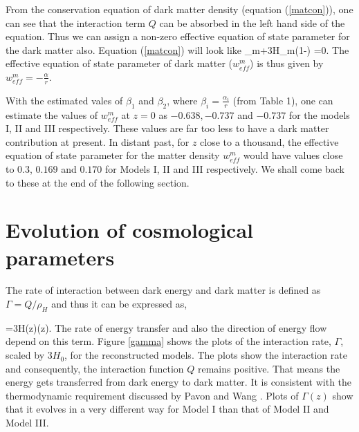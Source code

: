 \documentclass[11pt]{article}
\begin{document}
From the conservation equation of dark matter density (equation (\ref{matcon})), one can see that the interaction term $Q$ can be absorbed in the left hand side of the equation. Thus we can assign a non-zero effective equation of state parameter for the dark matter also. Equation (\ref{matcon}) will look like 
\be
\dot{\rho}_m+3H\rho_m(1-) =0.
\label{wmeff1}
\ee 
The effective equation of state parameter of dark matter ($w_{eff}^m$) is thus given by $w_{eff}^m = -\frac{\alpha}{r}$.


With the estimated vales of $\beta_1$ and $\beta_2$, where $\beta_i = \frac{\alpha_i}{r}$ (from Table 1), one can estimate the values of $w_{eff}^m$ at $z=0$ as $-0.638, -0.737$ and $-0.737$ for the models I, II and III respectively. These values are far too less to have a dark matter contribution at present. In distant past, for $z$ close to a thousand, the effective equation of state parameter for the matter density $w_{eff}^m$ would have values close to $0.3$, $0.169$ and $0.170$ for Models I, II and III respectively. We shall come back to these at the end of the following section.












\section{Evolution of cosmological parameters}
\label{cospar}



\par The rate of interaction between dark energy and dark matter is defined as $\Gamma=Q/\rho_H$  \cite{senpav, am} and thus it can be expressed as,

\be
\Gamma=3H(z)\alpha(z).
\ee
 The rate of energy transfer and also the direction of energy flow depend on this term. Figure \ref{gamma} shows the plots of the interaction rate, $\Gamma$, scaled by 3$H_0$, for the reconstructed models. The plots show the interaction rate and consequently, the interaction function $Q$ remains positive. That means the energy gets transferred from dark energy to dark matter. It is consistent with the thermodynamic requirement discussed by Pavon and Wang \cite{pavonwang}. Plots of $\Gamma(z)$ show that it evolves in a very different way for Model I than that of Model II and Model III.
\end{document}

